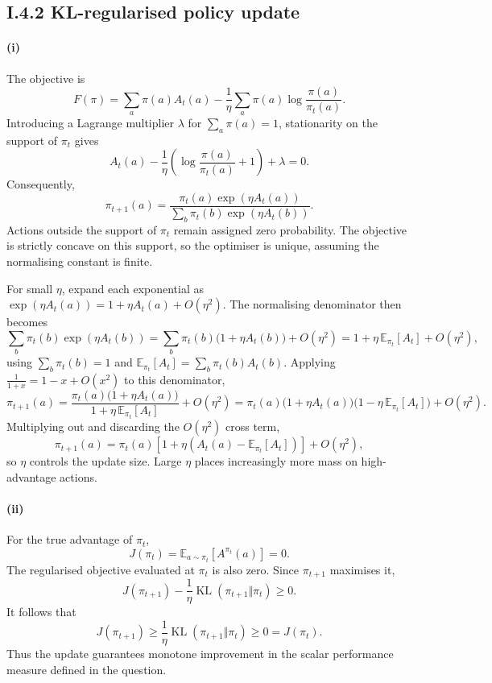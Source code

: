 \subsection*{I.4.2 KL-regularised policy update}

\paragraph{(i)}
The objective is
\[
F(\pi)
=
\sum_a\pi(a)A_t(a)
-\frac{1}{\eta}
\sum_a\pi(a)\log\frac{\pi(a)}{\pi_t(a)}.
\]
Introducing a Lagrange multiplier $\lambda$ for $\sum_a\pi(a)=1$, stationarity
on the support of $\pi_t$ gives
\[
A_t(a)
-\frac{1}{\eta}
\left(
\log\frac{\pi(a)}{\pi_t(a)}+1
\right)
+\lambda=0.
\]
Consequently,
\[
\boxed{
\pi_{t+1}(a)
=
\frac{\pi_t(a)\exp(\eta A_t(a))}
{\sum_b\pi_t(b)\exp(\eta A_t(b))}
}.
\]
Actions outside the support of $\pi_t$ remain assigned zero probability. The
objective is strictly concave on this support, so the optimiser is unique,
assuming the normalising constant is finite.

For small $\eta$, expand each exponential as
$\exp(\eta A_t(a))=1+\eta A_t(a)+O(\eta^2)$. The normalising denominator then
becomes
\[
\sum_b\pi_t(b)\exp(\eta A_t(b))
=
\sum_b\pi_t(b)\bigl(1+\eta A_t(b)\bigr)+O(\eta^2)
=
1+\eta\,\mathbb{E}_{\pi_t}[A_t]+O(\eta^2),
\]
using $\sum_b\pi_t(b)=1$ and $\mathbb{E}_{\pi_t}[A_t]=\sum_b\pi_t(b)A_t(b)$.
Applying $\frac{1}{1+x}=1-x+O(x^2)$ to this denominator,
\[
\pi_{t+1}(a)
=
\frac{\pi_t(a)\bigl(1+\eta A_t(a)\bigr)}
{1+\eta\,\mathbb{E}_{\pi_t}[A_t]}
+O(\eta^2)
=
\pi_t(a)\bigl(1+\eta A_t(a)\bigr)
\bigl(1-\eta\,\mathbb{E}_{\pi_t}[A_t]\bigr)
+O(\eta^2).
\]
Multiplying out and discarding the $O(\eta^2)$ cross term,
\[
\pi_{t+1}(a)
=
\pi_t(a)
\left[
1+\eta
\left(
A_t(a)-\mathbb{E}_{\pi_t}[A_t]
\right)
\right]
+O(\eta^2),
\]
so $\eta$ controls the update size. Large $\eta$ places increasingly more mass
on high-advantage actions.

\paragraph{(ii)}
For the true advantage of $\pi_t$,
\[
J(\pi_t)
=
\mathbb{E}_{a\sim\pi_t}[A^{\pi_t}(a)]
=0.
\]
The regularised objective evaluated at $\pi_t$ is also zero. Since
$\pi_{t+1}$ maximises it,
\[
J(\pi_{t+1})
-\frac{1}{\eta}
\operatorname{KL}(\pi_{t+1}\Vert\pi_t)
\geq 0.
\]
It follows that
\[
\boxed{
J(\pi_{t+1})
\geq
\frac{1}{\eta}
\operatorname{KL}(\pi_{t+1}\Vert\pi_t)
\geq 0
=
J(\pi_t).
}
\]
Thus the update guarantees monotone improvement in the scalar performance
measure defined in the question.

